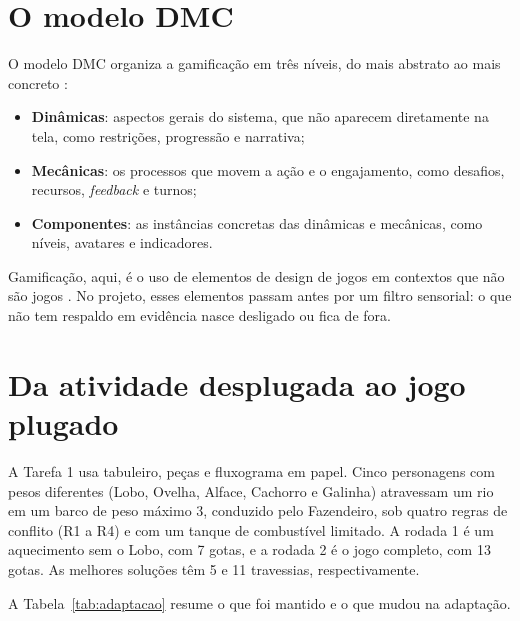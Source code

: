 \documentclass[12pt]{article}
\begin{document}
\section{O modelo DMC}

O modelo DMC organiza a gamificação em três níveis, do mais abstrato ao mais
concreto \cite{werbach2012}:

\begin{itemize}
  \item \textbf{Dinâmicas}: aspectos gerais do sistema, que não aparecem
        diretamente na tela, como restrições, progressão e narrativa;
  \item \textbf{Mecânicas}: os processos que movem a ação e o engajamento, como
        desafios, recursos, \textit{feedback} e turnos;
  \item \textbf{Componentes}: as instâncias concretas das dinâmicas e mecânicas,
        como níveis, avatares e indicadores.
\end{itemize}

Gamificação, aqui, é o uso de elementos de design de jogos em contextos que não
são jogos \cite{deterding2011}. No projeto, esses elementos passam antes por um
filtro sensorial: o que não tem respaldo em evidência nasce desligado ou fica de
fora.

\section{Da atividade desplugada ao jogo plugado}

A Tarefa 1 usa tabuleiro, peças e fluxograma em papel. Cinco personagens com
pesos diferentes (Lobo, Ovelha, Alface, Cachorro e Galinha) atravessam um rio em
um barco de peso máximo 3, conduzido pelo Fazendeiro, sob quatro regras de
conflito (R1 a R4) e com um tanque de combustível limitado. A rodada 1 é um
aquecimento sem o Lobo, com 7 gotas, e a rodada 2 é o jogo completo, com 13
gotas. As melhores soluções têm 5 e 11 travessias, respectivamente.

A Tabela~\ref{tab:adaptacao} resume o que foi mantido e o que mudou na
adaptação.
\end{document}
